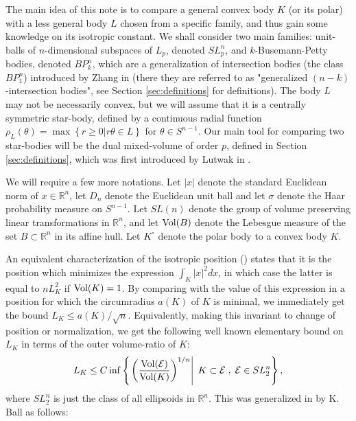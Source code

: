 \documentclass[12pt,oneside]{amsart}
\theoremstyle{definition}
\theoremstyle{remark}
\theoremstyle{proof}
\numberwithin{equation}{section}
\newcommand{\norm}[1]{\left\Vert#1\right\Vert}
\newcommand{\abs}[1]{\left\vert#1\right\vert}
\newcommand{\set}[1]{\left\{#1\right\}}
\newcommand{\brac}[1]{\left(#1\right)}
\newcommand{\Real}{\mathbb{R}}
\newcommand{\E}{\mathcal{E}}
\newcommand{\BP}{BP}
\newcommand{\Vol}[1]{\textnormal{Vol} (#1)}
\newcommand{\VolRatio}[2]{\brac{\frac{\Vol{#1}}{\Vol{#2}}}^{1/n}}
\begin{document}
The main idea of this note is to compare a general convex body
$K$ (or its polar) with a less general body $L$ chosen from a
specific family, and thus gain some knowledge on its isotropic
constant. We shall consider two main families: unit-balls of
$n$-dimensional subspaces of $L_p$, denoted $SL_p^n$, and
$k$-Busemann-Petty bodies, denoted $\BP_k^n$, which are a
generalization of intersection bodies (the class $\BP_1^n$)
introduced by Zhang in \cite{Zhang-Gen-BP} (there they are
referred to as "generalized $(n-k)$-intersection bodies", see
Section \ref{sec:definitions} for definitions). The body $L$ may
not be necessarily convex, but we will assume that it is a
centrally symmetric star-body, defined by a continuous radial
function $\rho_L(\theta) = \max \set{r \geq 0 | r\theta \in L }$
for $\theta \in S^{n-1}$. Our main tool for comparing two
star-bodies will be the dual mixed-volume of order $p$, defined
in Section \ref{sec:definitions}, which was first introduced by
Lutwak in \cite{Lutwak-dual-mixed-volumes}.

We will require a few more notations. Let $\abs{x}$ denote the
standard Euclidean norm of $x \in \Real^n$, let $D_n$ denote the
Euclidean unit ball and let $\sigma$ denote the Haar probability
measure on $S^{n-1}$. Let $SL(n)$ denote the group of volume
preserving linear transformations in $\Real^n$, and let $\Vol{B}$
denote the Lebesgue measure of the set $B \subset \Real^n$ in its
affine hull. Let $K^\circ$ denote the polar body to a convex body
$K$.

An equivalent characterization of the isotropic position
(\cite{Milman-Pajor-LK}) states that it is the position which
minimizes the expression $\int_K \abs{x}^2 dx$, in which case the
latter is equal to $n L_K^2$ if $\Vol{K}=1$. By comparing with
the value of this expression in a position for which the
circumradius $a(K)$ of $K$ is minimal, we immediately get the
bound $L_K \leq a(K) / \sqrt{n}$. Equivalently, making this
invariant to change of position or normalization, we get the
following well known elementary bound on $L_K$ in terms of the
outer volume-ratio of $K$:
\[
L_K \leq C \inf \set{\left . \VolRatio{\E}{K} \right | \; K
\subset \E \; , \; \E \in SL_2^n},
\]
where $SL_2^n$ is just the class of all ellipsoids in $\Real^n$.
This was generalized in \cite{Ball-weak-GL} by K. Ball as follows:
\end{document}
